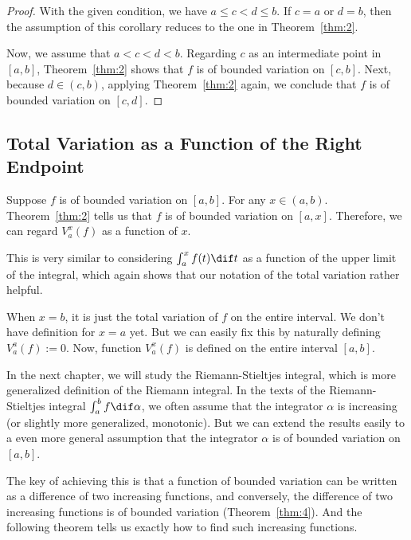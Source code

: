 \documentclass[thmcnt=section, color=blue, 12pt]{my-elegantbook}
\begin{document}
\begin{proof}
	With the given condition, we have $a \leq c < d \leq b$.
	If $c = a$ or $d = b$,
	then the assumption of this corollary reduces to the one in Theorem~\ref{thm:2}.

	Now, we assume that $a < c < d <b$.
	Regarding $c$ as an intermediate point in $[a, b]$,
	Theorem~\ref{thm:2} shows that $f$ is of bounded variation on $[c, b]$.
	Next, because $d \in (c, b)$, applying Theorem~\ref{thm:2} again,
	we conclude that $f$ is of bounded variation on $[c, d]$.
\end{proof}

\subsection{Total Variation as a Function of the Right Endpoint}

Suppose $f$ is of bounded variation on $[a, b]$.
For any $x \in (a, b)$.
Theorem~\ref{thm:2} tells us that $f$ is of bounded variation on $[a, x]$.
Therefore, we can regard $V_a^x (f)$ as a function of $x$.

\begin{note}
	This is very similar to considering $\int_a^x f(t) \dif t$ as a function
	of the upper limit of the integral, which
	again shows that our notation of the total variation rather helpful.
\end{note}

When $x = b$, it is just the total variation of $f$ on the entire interval.
We don't have definition for $x = a$ yet.
But we can easily fix this by naturally defining $V_a^a (f) := 0$.
Now, function $V_a^x(f)$ is defined on the entire interval $[a, b]$.

In the next chapter, we will study the Riemann-Stieltjes integral, which
is more generalized definition of the Riemann integral.
In the texts of the Riemann-Stieltjes integral $\int_a^b f \dif \alpha$,
we often assume that the integrator $\alpha$ is increasing
(or slightly more generalized, monotonic)\cite{rudinPrinciplesMathematicalAnalysis1976}.
But we can extend the results easily to a even more
general assumption that the integrator $\alpha$
is of bounded variation on $[a, b]$.

The key of achieving this is that a function of bounded variation
can be written as a difference of two increasing functions,
and conversely, the difference of two increasing functions
is of bounded variation
(Theorem~\ref{thm:4}).
And the following theorem tells us exactly how to
find such increasing
functions.
\end{document}
